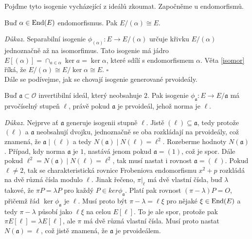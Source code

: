 \documentclass[12pt]{report}
\begin{document}
Pojďme tyto isogenie vycházející z ideálů zkoumat. Započněme u endomorfismů.
\begin{lemma}\label{endo}
Buď $\alpha \in \operatorname{End}(E)$ endomorfismus. Pak $E/(\alpha) \cong E$.
\end{lemma}
\noindent \textit{Důkaz.} Separabilní isogenie $\phi_{(\alpha)} : E \longrightarrow E/(\alpha)$ určuje křivku $E/(\alpha)$ jednoznačně až na isomorfimus. Tato isogenie má jádro $E[(\alpha)] = \cap_{a \in \alpha} \ker a = \ker \alpha$, které sdílí s endomorfismem $\alpha$. Věta \ref{isomor} říká, že $E/(\alpha) \cong E/\ker \alpha \cong E$. \hfill $\square$\\


Dále se podívejme, jak se chovají isogenie generované prvoideály. 

\begin{veta}\label{normm}
Buď $\mathfrak{a} \subset \mathcal{O}$ invertibilní ideál, který neobsahuje $2$. Pak isogenie $\phi_{\mathfrak{a}} : E \longrightarrow E/\mathfrak{a}$ má prvočíselný stupeň $\ell$, právě pokud $\mathfrak{a}$ je prvoideál, jehož norma je $\ell$.
\end{veta}
\noindent \textit{Důkaz.} Nejprve ať $\mathfrak{a}$ generuje isogenii stupně $\ell$. Jistě $(\ell) \subseteq \mathfrak{a}$, tedy protože $(\ell)$ a $\mathfrak{a}$ neobsahují dvojku, jednoznačně se oba rozkládají na prvoideály, což znamená, že $\mathfrak{a} \mid (\ell)$ a tedy $N(\mathfrak{a}) \mid N(\ell) = \ell ^2$. Rozeberme hodnoty $N(\mathfrak{a})$. Případ, kdy norma $\mathfrak{a}$ je $1$, nastává jenom pokud $\mathfrak{a} = (1)$, což je spor. Dále pokud $ \ell^2 = N(\mathfrak{a})  \mid N(\ell) = \ell ^2$, tak musí nastat i rovnost $\mathfrak{a} = (\ell)$. Pokud $\ell \neq 2$, tak se charakteristická rovnice Frobeniova endomorfismu $x^2 + p$ rozkládá na dvě různá čísla modulo $\ell$. Jinak řečeno, $\pi \vert_{\ell}$ má dvě vlastní čísla, buď $\lambda$ takové, že $\pi P = \lambda P$ pro každý $P \in ker \phi_{\mathfrak{a}}$. Platí pak rovnost $(\pi - \lambda) P = O$, přičemž řád $\ker \phi_{\mathfrak{a}}$ je $\ell$. Musí proto být $\pi - \lambda = \ell \xi$ pro nějaké $\xi \in \operatorname{End}(E)$ a tedy $\pi - \lambda$ působí jako $\ell \xi$ na celou $E[\ell]$. To je ale spor, protože pak $\pi E[\ell] = \lambda E[\ell]$, ale $\pi$ má dvě různá vlastní čísla. Musí proto nastat $N(\mathfrak{a}) = \ell$, což jistě znamená, že $\mathfrak{a}$ je prvoideálem.
\end{document}
